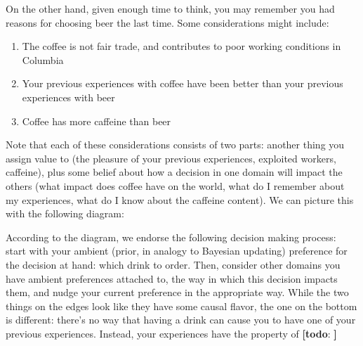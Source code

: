\documentclass{article}
\theoremstyle{plain}
\theoremstyle{definition}
\theoremstyle{remark}
\newcommand\lab[1]{(#1)(lab-#1)}
\newcommand{\todo}[1]{{\color{red}\large\textbf{[todo}: {\normalsize\itshape#1}\textbf{]}}}
\begin{document}
	
	On the other hand, given enough time to think, you may remember you had reasons for choosing beer the last time. Some considerations might include:
	\begin{enumerate}[nosep]
		\item The coffee is not fair trade, and contributes to poor working conditions in Columbia
		\item Your previous experiences with coffee have been better than your previous experiences with beer
		\item Coffee has more caffeine than beer	
	\end{enumerate}
	
	Note that each of these considerations consists of two parts: another thing you assign value to (the pleasure of your previous experiences, exploited workers, caffeine), plus some belief about how a decision in one domain will impact the others (what impact does coffee have on the world, what do I remember about my experiences, what do I know about the caffeine content). We can picture this with the following diagram:
	
	\begin{center}
	\end{center}
	According to the diagram, we endorse the following decision making process: start with your ambient (prior, in analogy to Bayesian updating) preference for the decision at hand: which drink to order. Then, consider other domains you have ambient preferences attached to, the way in which this decision impacts them, and nudge your current preference in the appropriate way. While the two things on the edges look like they have some causal flavor, the one on the bottom is different: there's no way that having a drink can cause you to have one of your previous experiences. Instead, your experiences have the property of \todo{}
	
\end{document}
